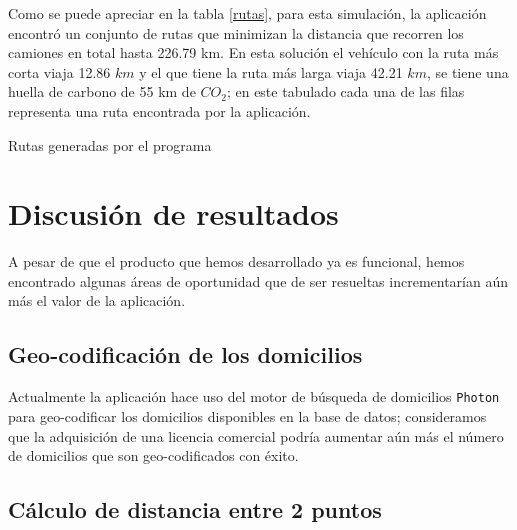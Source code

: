 \documentclass[journal]{IEEEtran}
\begin{document}
            Como se puede apreciar en la tabla \ref{rutas}, para esta simulación, la aplicación encontró un conjunto de rutas que minimizan la distancia que recorren los camiones en total hasta 226.79 km. En esta solución el vehículo con la ruta más corta viaja 12.86 $km$ y el que tiene la ruta más larga viaja 42.21 $km$, se tiene una huella de carbono de 55 km de $CO_2$; en este tabulado cada una de las filas representa una ruta encontrada por la aplicación.
            
            \begin{table}[h!]
                \centering
                \caption{Rutas generadas por el programa}
                \label{rutas}
            \end{table}
            
    \section{Discusión de resultados} \label{sec:discusion}
        
        A pesar de que el producto que hemos desarrollado ya es funcional, hemos encontrado algunas áreas de oportunidad que de ser resueltas incrementarían aún más el valor de la aplicación.
        
        \subsection{Geo-codificación de los domicilios}
            
            Actualmente la aplicación hace uso del motor de búsqueda de domicilios \texttt{Photon} \cite{photon} para geo-codificar los domicilios disponibles en la base de datos; consideramos que la adquisición de una licencia comercial podría aumentar aún más el número de domicilios que son geo-codificados con éxito.
            
        \subsection{Cálculo de distancia entre 2 puntos}
            
\end{document}
